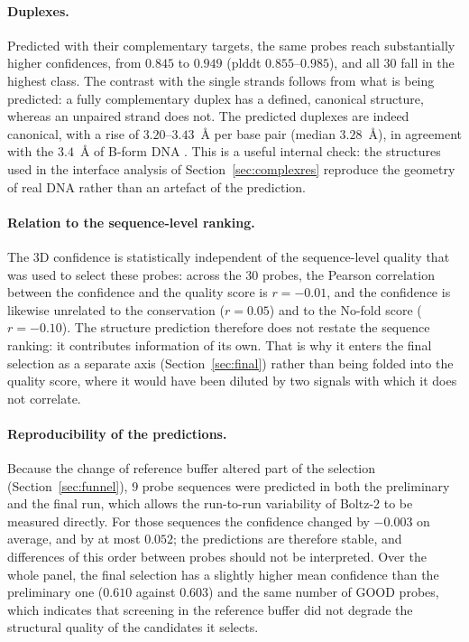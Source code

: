\paragraph{Duplexes.} Predicted with their complementary targets, the same probes reach
substantially higher confidences, from $0.845$ to $0.949$ (\acrshort{plddt} $0.855$--$0.985$), and
all $30$ fall in the highest class. The contrast with the single strands follows from what is being
predicted: a fully complementary duplex has a defined, canonical structure, whereas an unpaired
strand does not. The predicted duplexes are indeed canonical, with a rise of
$3.20$--$3.43$~\AA{} per base pair (median $3.28$~\AA{}), in agreement with the $3.4$~\AA{} of
B-form DNA \citep{watsoncrick1953}. This is a useful internal check: the structures used in the
interface analysis of Section~\ref{sec:complexres} reproduce the geometry of real DNA rather than an
artefact of the prediction.

\paragraph{Relation to the sequence-level ranking.} The 3D confidence is statistically independent
of the sequence-level quality that was used to select these probes: across the $30$ probes, the
Pearson correlation between the confidence and the quality score is $r = -0.01$, and the confidence
is likewise unrelated to the conservation ($r = 0.05$) and to the No-fold score ($r = -0.10$). The
structure prediction therefore does not restate the sequence ranking: it contributes information of
its own. That is why it enters the final selection as a separate axis (Section~\ref{sec:final})
rather than being folded into the quality score, where it would have been diluted by two signals
with which it does not correlate.

\paragraph{Reproducibility of the predictions.} Because the change of reference buffer altered part
of the selection (Section~\ref{sec:funnel}), $9$ probe sequences were predicted in both the
preliminary and the final run, which allows the run-to-run variability of Boltz-2 to be measured
directly. For those sequences the confidence changed by $-0.003$ on average, and by at most
$0.052$; the predictions are therefore stable, and differences of this order between probes should
not be interpreted. Over the whole panel, the final selection has a slightly higher mean confidence
than the preliminary one ($0.610$ against $0.603$) and the same number of GOOD probes,
which indicates that screening in the reference buffer did not degrade the structural quality of the
candidates it selects.


